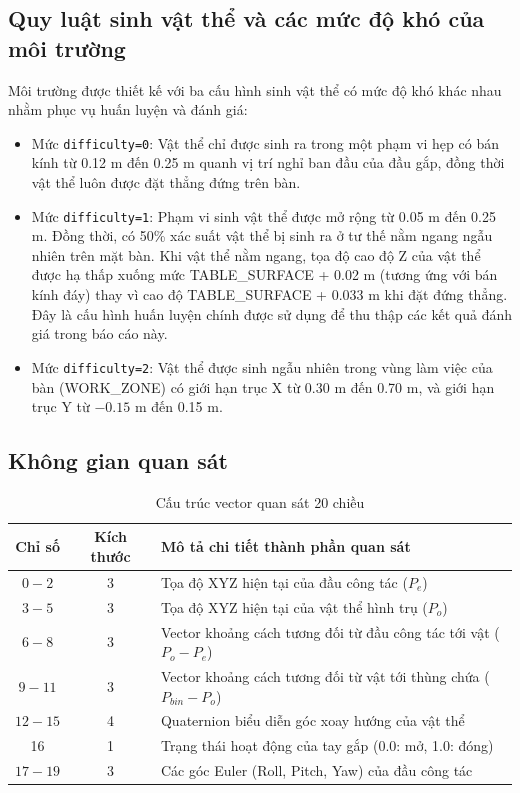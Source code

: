 \documentclass[conference]{IEEEtran}
\begin{document}
\subsection{Quy luật sinh vật thể và các mức độ khó của môi trường}
Môi trường được thiết kế với ba cấu hình sinh vật thể có mức độ khó khác nhau nhằm phục vụ huấn luyện và đánh giá:
\begin{itemize}
    \item Mức \texttt{difficulty=0}: Vật thể chỉ được sinh ra trong một phạm vi hẹp có bán kính từ 0.12 m đến 0.25 m quanh vị trí nghỉ ban đầu của đầu gắp, đồng thời vật thể luôn được đặt thẳng đứng trên bàn.
    \item Mức \texttt{difficulty=1}: Phạm vi sinh vật thể được mở rộng từ 0.05 m đến 0.25 m. Đồng thời, có 50\% xác suất vật thể bị sinh ra ở tư thế nằm ngang ngẫu nhiên trên mặt bàn. Khi vật thể nằm ngang, tọa độ cao độ Z của vật thể được hạ thấp xuống mức TABLE\_SURFACE + 0.02 m (tương ứng với bán kính đáy) thay vì cao độ TABLE\_SURFACE + 0.033 m khi đặt đứng thẳng. Đây là cấu hình huấn luyện chính được sử dụng để thu thập các kết quả đánh giá trong báo cáo này.
    \item Mức \texttt{difficulty=2}: Vật thể được sinh ngẫu nhiên trong vùng làm việc của bàn (WORK\_ZONE) có giới hạn trục X từ 0.30 m đến 0.70 m, và giới hạn trục Y từ $-0.15$ m đến 0.15 m.
\end{itemize}

\subsection{Không gian quan sát}

\begin{table}[!t]
\caption{Cấu trúc vector quan sát 20 chiều}
\label{tab:observation}
\centering
\scriptsize
\begin{tabularx}{\textwidth}{@{}ccX@{}}
\toprule
Chỉ số & Kích thước & Mô tả chi tiết thành phần quan sát\\
\midrule
$0 - 2$ & 3 & Tọa độ XYZ hiện tại của đầu công tác ($P_e$)\\
$3 - 5$ & 3 & Tọa độ XYZ hiện tại của vật thể hình trụ ($P_o$)\\
$6 - 8$ & 3 & Vector khoảng cách tương đối từ đầu công tác tới vật ($P_o - P_e$)\\
$9 - 11$ & 3 & Vector khoảng cách tương đối từ vật tới thùng chứa ($P_{bin} - P_o$)\\
$12 - 15$ & 4 & Quaternion biểu diễn góc xoay hướng của vật thể\\
16 & 1 & Trạng thái hoạt động của tay gắp (0.0: mở, 1.0: đóng)\\
$17 - 19$ & 3 & Các góc Euler (Roll, Pitch, Yaw) của đầu công tác\\
\bottomrule
\end{tabularx}
\end{table}
\end{document}
